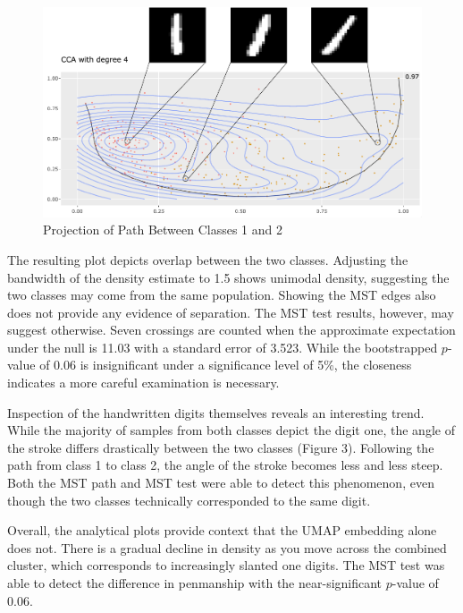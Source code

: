 \documentclass{article}
\begin{document}
{\renewcommand{\figurename}{Figure}
\renewcommand{\thefigure}{3}
\begin{figure}[!t]
\centering
\includegraphics[scale=0.38]{class 1+2 projection MNIST}
\caption{Projection of Path Between Classes 1 and 2}
\end{figure}

The resulting plot depicts overlap between the two classes. Adjusting the bandwidth of the density estimate to 1.5 shows unimodal density, suggesting the two classes may come from the same population. Showing the MST edges also does not provide any evidence of separation. The MST test results, however, may suggest otherwise. Seven crossings are counted when the approximate expectation under the null is 11.03 with a standard error of 3.523. While the bootstrapped $p$-value of $0.06$ is insignificant under a significance level of 5\%, the closeness indicates a more careful examination is necessary.

Inspection of the handwritten digits themselves reveals an interesting trend. While the majority of samples from both classes depict the digit one, the angle of the stroke differs drastically between the two classes (Figure 3). Following the path from class 1 to class 2, the angle of the stroke becomes less and less steep. Both the MST path and MST test were able to detect this phenomenon, even though the two classes technically corresponded to the same digit.

Overall, the analytical plots provide context that the UMAP embedding alone does not. There is a gradual decline in density as you move across the combined cluster, which corresponds to increasingly slanted one digits. The MST test was able to detect the difference in penmanship with the near-significant $p$-value of $0.06$.

}
\end{document}
